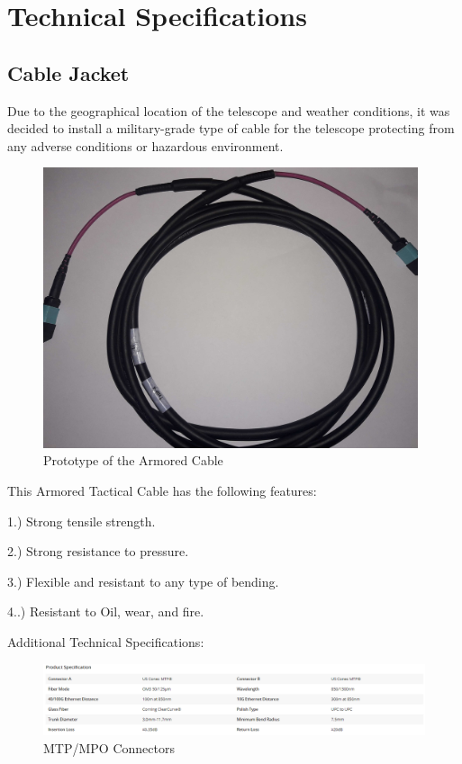 \section{Technical Specifications}

\subsection{Cable Jacket}

  Due to the geographical location of the telescope and weather conditions, it was decided to install a military-grade type of cable for the telescope protecting from any adverse conditions or hazardous environment. 

\begin{figure}
  \includegraphics[width=11cm]{images/mtp_militar_cable.jpg}
  \centering
  \caption{Prototype of the Armored Cable}
  \label{fig:jlsimon}
\end{figure}

This Armored Tactical Cable has the following features:

1.) Strong tensile strength.

2.) Strong resistance to pressure.

3.) Flexible and resistant to any type of bending.

4..) Resistant to Oil, wear, and fire.


Additional Technical Specifications:

\begin{figure}
  \includegraphics[width=\textwidth]{images/2.png}
  \caption{MTP/MPO Connectors}
  \label{fig:jlsimon}
\end{figure}



